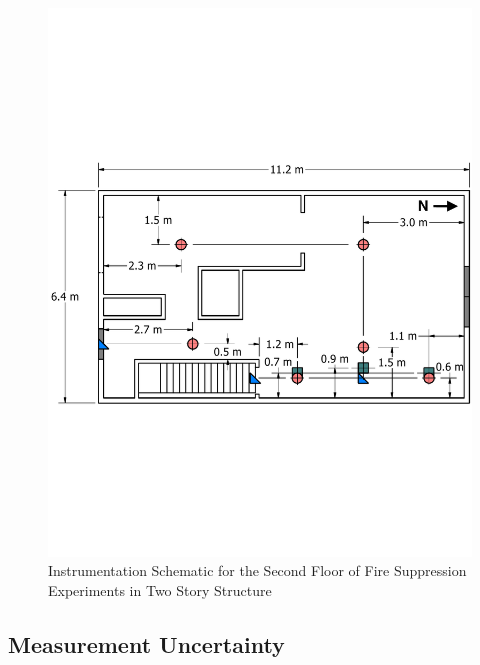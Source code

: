 \documentclass[12pt,oneside]{book}
\begin{document}
\begin{figure}[!ht]
	\includegraphics[width=\columnwidth]{../../DelCo_2014_2015/Drawings/PDFs/CAFS/West_Structure_2nd_Floor_Instrumentation}
	\caption{Instrumentation Schematic for the Second Floor of Fire Suppression Experiments in Two Story Structure}
	\label{fig:fire_supp_second_2story}
\end{figure}

\clearpage

\subsection{Measurement Uncertainty}
\label{subsec:Uncertainty}
\end{document}
